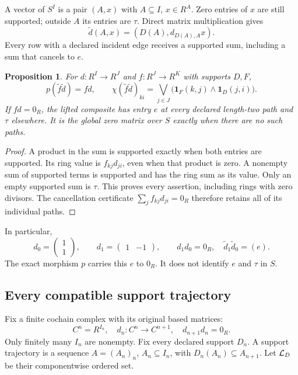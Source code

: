 \documentclass[11pt,a4paper]{article}
\newtheorem{proposition}[theorem]{Proposition}
\theoremstyle{definition}\newtheorem{definition}[theorem]{Definition}
\begin{document}
A vector of \(S^I\) is a pair \((A,x)\) with \(A\subseteq I\),
\(x\in R^A\). Zero entries of \(x\) are still supported; outside
\(A\) its entries are \(\tau\). Direct matrix multiplication gives
\[
 \widetilde d(A,x)=(D(A),d_{D(A),A}x).
 \tag{SCD3}
\]
Every row with a declared incident edge receives a supported sum,
including a sum that cancels to \(e\).

\begin{proposition}
For \(d:R^I\to R^J\) and \(f:R^J\to R^K\) with supports \(D,F\),
\[
 p(\widetilde f\widetilde d)=fd,\qquad
 \chi(\widetilde f\widetilde d)_{ki}
 =\bigvee_{j\in J}\bigl(\mathbf1_F(k,j)\wedge\mathbf1_D(j,i)\bigr).
 \tag{SCD4}
\]
If \(fd=0_R\), the lifted composite has entry \(e\) at every
declared length-two path and \(\tau\) elsewhere. It is the global
zero matrix over \(S\) exactly when there are no such paths.
\end{proposition}
\begin{proof}
A product in the sum is supported exactly when both entries are
supported. Its ring value is \(f_{kj}d_{ji}\), even when that product
is zero. A nonempty sum of supported terms is supported and has the
ring sum as its value. Only an empty supported sum is \(\tau\).
This proves every assertion, including rings with zero divisors.
The cancellation certificate \(\sum_j f_{kj}d_{ji}=0_R\) therefore
retains all of its individual paths.
\end{proof}

In particular,
\[
 d_0=\begin{pmatrix}1\\1\end{pmatrix},\qquad
 d_1=\begin{pmatrix}1&-1\end{pmatrix},
 \qquad d_1d_0=0_R,\quad \widetilde d_1\widetilde d_0=(e).
 \tag{SCD5}
\]
The exact morphism \(p\) carries this \(e\) to \(0_R\).
It does not identify \(e\) and \(\tau\) in \(S\).

\subsection{Every compatible support trajectory}

Fix a finite cochain complex with its original based matrices:
\[
 C^n=R^{I_n},\quad d_n:C^n\to C^{n+1},\quad
 d_{n+1}d_n=0_R.
 \tag{SCD6}
\]
Only finitely many \(I_n\) are nonempty. Fix every declared support \(D_n\).
A support trajectory is a sequence \(A=(A_n)_n\), \(A_n\subseteq I_n\),
with \(D_n(A_n)\subseteq A_{n+1}\). Let \(\mathcal L_D\) be their componentwise
ordered set.
\end{document}
